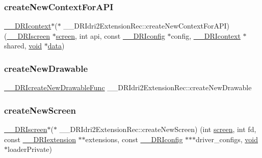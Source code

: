\subsubsection{\texorpdfstring{create\+New\+Context\+For\+A\+PI}{createNewContextForAPI}}
{\footnotesize\ttfamily \hyperlink{dri__interface_8h_a3fd295cba82b5a3d79f1ee7e12bfb908}{\+\_\+\+\_\+\+D\+R\+Icontext}$\ast$($\ast$ \+\_\+\+\_\+\+D\+R\+Idri2\+Extension\+Rec\+::create\+New\+Context\+For\+A\+PI) (\hyperlink{dri__interface_8h_a9961b01d421ee1fd6ed3c05acc9ca561}{\+\_\+\+\_\+\+D\+R\+Iscreen} $\ast$\hyperlink{cad_8h_ae04e09e4e3831bfc1632c509ae37dcec}{screen}, int api, const \hyperlink{dri__interface_8h_aeac81999efbbf8b1d6886338e3ea24d9}{\+\_\+\+\_\+\+D\+R\+Iconfig} $\ast$config, \hyperlink{dri__interface_8h_a3fd295cba82b5a3d79f1ee7e12bfb908}{\+\_\+\+\_\+\+D\+R\+Icontext} $\ast$shared, \hyperlink{_s_d_l__opengles2__gl2ext_8h_ae5d8fa23ad07c48bb609509eae494c95}{void} $\ast$\hyperlink{gl_8h_a2e335d56e2846b0fea47eed068b2d34a}{data})}

\mbox{\label{struct_____d_r_idri2_extension_rec_a8ab2424cbe4598219f503e9e7dad2d04}} 
\subsubsection{\texorpdfstring{create\+New\+Drawable}{createNewDrawable}}
{\footnotesize\ttfamily \hyperlink{dri__interface_8h_ac32374b98e1c97cd35c2d247455c0a57}{\+\_\+\+\_\+\+D\+R\+Icreate\+New\+Drawable\+Func} \+\_\+\+\_\+\+D\+R\+Idri2\+Extension\+Rec\+::create\+New\+Drawable}

\mbox{\label{struct_____d_r_idri2_extension_rec_ac66b0bfcd83df59d0ce66d6aa1a44a91}} 
\subsubsection{\texorpdfstring{create\+New\+Screen}{createNewScreen}}
{\footnotesize\ttfamily \hyperlink{dri__interface_8h_a9961b01d421ee1fd6ed3c05acc9ca561}{\+\_\+\+\_\+\+D\+R\+Iscreen}$\ast$($\ast$ \+\_\+\+\_\+\+D\+R\+Idri2\+Extension\+Rec\+::create\+New\+Screen) (int \hyperlink{cad_8h_ae04e09e4e3831bfc1632c509ae37dcec}{screen}, int fd, const \hyperlink{dri__interface_8h_a4e0a61c8ece00d2b2c6792a9a1b55385}{\+\_\+\+\_\+\+D\+R\+Iextension} $\ast$$\ast$extensions, const \hyperlink{dri__interface_8h_aeac81999efbbf8b1d6886338e3ea24d9}{\+\_\+\+\_\+\+D\+R\+Iconfig} $\ast$$\ast$$\ast$driver\+\_\+configs, \hyperlink{_s_d_l__opengles2__gl2ext_8h_ae5d8fa23ad07c48bb609509eae494c95}{void} $\ast$loader\+Private)}

